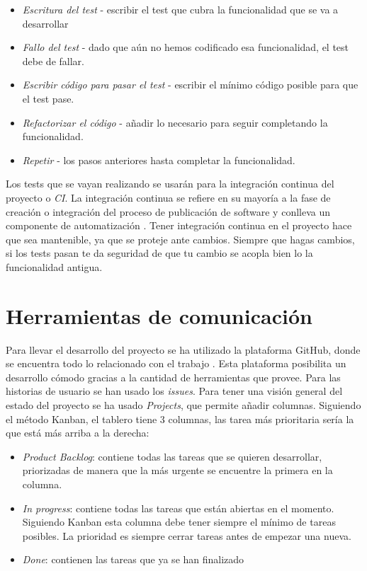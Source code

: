 \begin{itemize}
    \item \textit{Escritura del test} - escribir el test que cubra la funcionalidad que se va a desarrollar
    \item \textit{Fallo del test} - dado que aún no hemos codificado esa funcionalidad, el test debe de fallar.
    \item \textit{Escribir código para pasar el test} - escribir el mínimo código posible para que el test pase.
    \item \textit{Refactorizar el código} - añadir lo necesario para seguir completando la funcionalidad.
    \item \textit{Repetir} - los pasos anteriores hasta completar la funcionalidad.
\end{itemize}

Los tests que se vayan realizando se usarán para la integración continua del proyecto o \emph{CI}.
La integración continua se refiere en su mayoría a la fase de creación o integración del proceso de publicación de
software y conlleva un componente de automatización \cite{CI}. Tener integración continua en el proyecto hace que sea
mantenible, ya que se proteje ante cambios. Siempre que hagas cambios, si los tests pasan te da seguridad de que tu cambio se 
acopla bien lo la funcionalidad antigua. 


\section{Herramientas de comunicación}

Para llevar el desarrollo del proyecto se ha utilizado la plataforma GitHub, donde se encuentra todo lo 
relacionado con el trabajo \cite{project_repository}. Esta plataforma posibilita un desarrollo cómodo gracias a la cantidad
de herramientas que provee. Para las historias de usuario se han usado los \textit{issues}. Para tener una
visión general del estado del proyecto se ha usado \textit{Projects}, que permite añadir columnas. Siguiendo el método Kanban, el
tablero tiene 3 columnas, las tarea más prioritaria sería la que está más arriba a la derecha:

\begin{itemize}
    \item \emph{Product Backlog}: contiene todas las tareas que se quieren desarrollar, priorizadas de manera que la más urgente
    se encuentre la primera en la columna.
    \item \emph{In progress}: contiene todas las tareas que están abiertas en el momento. Siguiendo Kanban esta columna
    debe tener siempre el mínimo de tareas posibles. La prioridad es siempre cerrar tareas antes de empezar una nueva.
    \item \emph{Done}: contienen las tareas que ya se han finalizado
\end{itemize}


